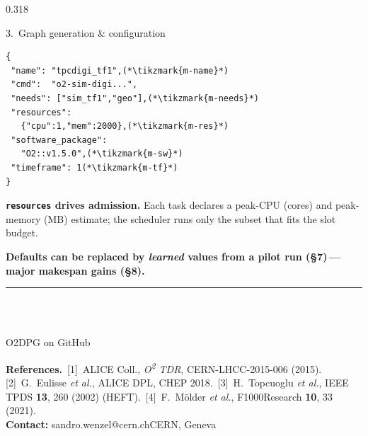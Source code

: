 \documentclass[final,t]{beamer}
\begin{document}
\begin{frame}[t,fragile]
\begin{columns}[t,onlytextwidth]
\begin{column}{0.318\textwidth}
\begin{infoblock}{3.~Graph generation \& configuration}
\vspace{3mm}
\noindent
\begin{minipage}{0.58\linewidth}
\begin{lstlisting}[style=jsonstyle]
{
 "name": "tpcdigi_tf1",(*\tikzmark{m-name}*)
 "cmd":  "o2-sim-digi...",
 "needs": ["sim_tf1","geo"],(*\tikzmark{m-needs}*)
 "resources":
   {"cpu":1,"mem":2000},(*\tikzmark{m-res}*)
 "software_package":
   "O2::v1.5.0",(*\tikzmark{m-sw}*)
 "timeframe": 1(*\tikzmark{m-tf}*)
}
\end{lstlisting}
\end{minipage}%

\vspace{8mm}

\textbf{\texttt{resources} drives admission.}
Each task declares a peak-CPU (cores) and peak-memory (MB) estimate;
the scheduler runs only the subset that fits the slot budget.

\vspace{5mm}

\noindent\colorbox{cernblue}{%
  \parbox{\dimexpr\linewidth-2\fboxsep\relax}{\centering
    \color{white}\bfseries
    Defaults can be replaced by \emph{learned} values from a pilot run
    (\S7)\,---\,major makespan gains (\S8).\strut
  }%
}
\end{infoblock}

\vfill

\noindent\textcolor{cernblue}{\rule{\linewidth}{2pt}}\\[3mm]

\noindent
\begin{minipage}[c]{5.5cm}\centering
  \\[1mm]
  {\scriptsize O2DPG on GitHub}
\end{minipage}\hfill
\begin{minipage}[c]{\dimexpr\linewidth-5.5cm-5mm\relax}\footnotesize
\textbf{References.}\,
[1]~ALICE Coll., \emph{O\textsuperscript{2} TDR}, CERN-LHCC-2015-006 (2015).\,
[2]~G.~Eulisse \emph{et al.}, ALICE DPL, CHEP 2018.\,
[3]~H.~Topcuoglu \emph{et al.}, IEEE TPDS \textbf{13}, 260 (2002) (HEFT).\,
[4]~F.~M\"older \emph{et al.}, F1000Research \textbf{10}, 33 (2021).\\[2mm]
\textbf{Contact:}\; sandro.wenzel@cern.ch\quad\textbullet\quad CERN, Geneva
\end{minipage}


\end{column}
\end{columns}
\end{frame}
\end{document}
